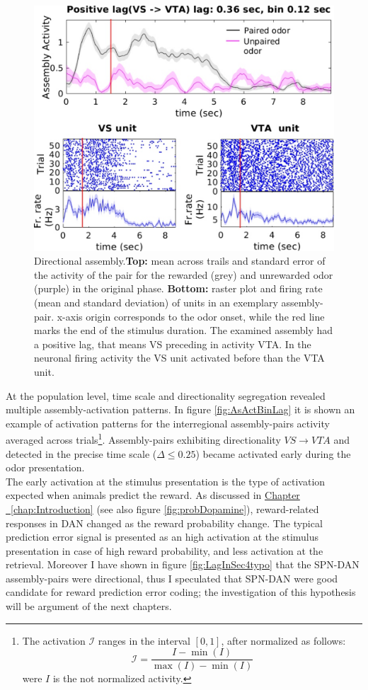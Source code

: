 \begin{figure}[H]
    \centering
    \includegraphics[scale=0.6]{figures/DirectionalAsEx1.pdf}
    \caption{Directional assembly.\textbf{Top:} mean across trails and standard error of the activity of the pair for the rewarded (grey) and unrewarded odor (purple) in the original phase. \textbf{Bottom:} raster plot and firing rate (mean and standard deviation) of units in an exemplary assembly-pair. x-axis origin corresponds to the odor onset, while the red line marks the end of the stimulus duration. The examined assembly had a positive lag, that means VS preceding in activity VTA. In the neuronal firing activity the VS unit activated before than the VTA unit.}
    \label{fig:directional_assembly}
\end{figure}
At the population level, time scale and directionality segregation revealed multiple assembly-activation patterns. In figure \ref{fig:AsActBinLag} it is shown an example of activation patterns for the interregional assembly-pairs activity averaged across trials\footnote{The activation $\mathcal{I}$ ranges in the interval $[0,1]$, after normalized as follows:
\begin{equation}
    \mathcal{I} = \frac{I-\min(I)}{\max(I)-\min(I)}
    \label{eq:norm}
\end{equation} were $I$ is the not normalized activity.}. 
Assembly-pairs exhibiting directionality $VS \rightarrow VTA$ and detected in the precise time scale ($\Delta \le 0.25$) became activated early during the odor presentation.\\The early activation at the stimulus presentation is the type of activation expected when animals predict the reward. As discussed in \hyperref[chap:Introduction]{Chapter ~\ref*{chap:Introduction}} (see also figure \ref{fig:probDopamine}), reward-related responses in DAN changed as the reward probability change. The typical prediction error signal is presented as an high activation at the stimulus presentation in case of high reward probability, and less activation at the retrieval. Moreover I have shown in figure \ref{fig:LagInSec4typo} that the SPN-DAN assembly-pairs were directional, thus I speculated that SPN-DAN were good candidate for reward prediction error coding; the investigation of this hypothesis will be argument of the next chapters.
